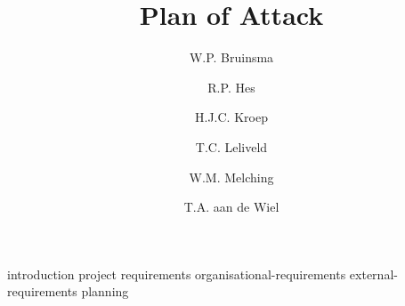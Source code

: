 \documentclass[a4paper, openany, oneside]{memoir}
\title{Plan of Attack}
\author{W.P. Bruinsma \and R.P. Hes \and H.J.C. Kroep \and T.C. Leliveld \and W.M. Melching \and T.A. aan de Wiel}
\begin{document}
\frontmatter

\begin{titlingpage}
  \pagestyle{empty}
  \maketitle
\end{titlingpage}


\tableofcontents

\mainmatter
{introduction}
{project}
{requirements}
{organisational-requirements}
{external-requirements}
{planning}

\printbibliography

\appendix
\end{document}
